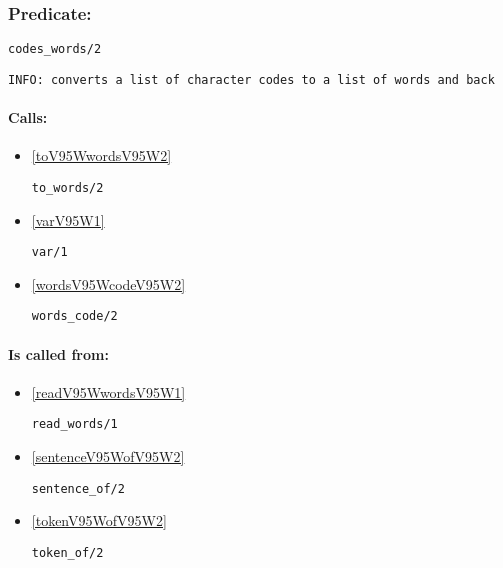 \subsubsection{Predicate:} \label{codesV95WwordsV95W2}

\begin{verbatim}
codes_words/2
\end{verbatim}

{\small \begin{verbatim}
INFO: converts a list of character codes to a list of words and back

\end{verbatim}}
\paragraph{Calls:} 
\begin{itemize}
\item \ref{toV95WwordsV95W2} 
\begin{verbatim}
to_words/2
\end{verbatim}

\item \ref{varV95W1} 
\begin{verbatim}
var/1
\end{verbatim}

\item \ref{wordsV95WcodeV95W2} 
\begin{verbatim}
words_code/2
\end{verbatim}

\end{itemize}
\paragraph{Is called from:} 
\begin{itemize}
\item \ref{readV95WwordsV95W1} 
\begin{verbatim}
read_words/1
\end{verbatim}

\item \ref{sentenceV95WofV95W2} 
\begin{verbatim}
sentence_of/2
\end{verbatim}

\item \ref{tokenV95WofV95W2} 
\begin{verbatim}
token_of/2
\end{verbatim}

\end{itemize}

